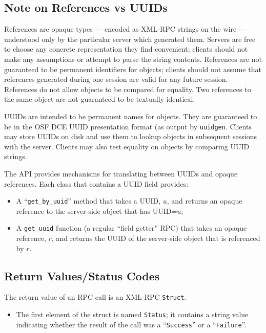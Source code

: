 \subsection{Note on References vs UUIDs}

References are opaque types --- encoded as XML-RPC strings on the wire --- understood
only by the particular server which generated them. Servers are free to choose
any concrete representation they find convenient; clients should not make any 
assumptions or attempt to parse the string contents. References are not guaranteed
to be permanent identifiers for objects; clients should not assume that references 
generated during one session are valid for any future session. References do not
allow objects to be compared for equality. Two references to the same object are
not guaranteed to be textually identical.

UUIDs are intended to be permanent names for objects. They are
guaranteed to be in the OSF DCE UUID presentation format (as output by {\tt uuidgen}.
Clients may store UUIDs on disk and use them to lookup objects in subsequent sessions
with the server. Clients may also test equality on objects by comparing UUID strings.

The API provides mechanisms
for translating between UUIDs and opaque references. Each class that contains a UUID
field provides:
\begin{itemize}
\item  A ``{\tt get\_by\_uuid}'' method that takes a UUID, $u$, and returns an opaque reference
to the server-side object that has UUID=$u$; 
\item A {\tt get\_uuid} function (a regular ``field getter'' RPC) that takes an opaque reference,
$r$, and returns the UUID of the server-side object that is referenced by $r$.
\end{itemize}

\subsection{Return Values/Status Codes}
\label{synchronous-result}

The return value of an RPC call is an XML-RPC {\tt Struct}.

\begin{itemize}
\item The first element of the struct is named {\tt Status}; it
contains a string value indicating whether the result of the call was
a ``{\tt Success}'' or a ``{\tt Failure}''.
\end{itemize}

